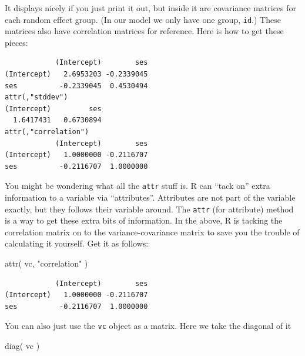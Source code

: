 \documentclass[
  letterpaper,
  DIV=11,
  numbers=noendperiod]{scrreprt}
\newenvironment{Shaded}{}{}
\newcommand{\FunctionTok}[1]{\textcolor[rgb]{0.02,0.16,0.49}{#1}}
\newcommand{\NormalTok}[1]{#1}
\newcommand{\OtherTok}[1]{\textcolor[rgb]{0.00,0.44,0.13}{#1}}
\newcommand{\SpecialCharTok}[1]{\textcolor[rgb]{0.25,0.44,0.63}{#1}}
\newcommand{\StringTok}[1]{\textcolor[rgb]{0.25,0.44,0.63}{#1}}
\begin{document}
It displays nicely if you just print it out, but inside it are
covariance matrices for each random effect group. (In our model we only
have one group, \texttt{id}.) These matrices also have correlation
matrices for reference. Here is how to get these pieces:

\begin{Shaded}
\end{Shaded}

\begin{verbatim}
            (Intercept)        ses
(Intercept)   2.6953203 -0.2339045
ses          -0.2339045  0.4530494
attr(,"stddev")
(Intercept)         ses 
  1.6417431   0.6730894 
attr(,"correlation")
            (Intercept)        ses
(Intercept)   1.0000000 -0.2116707
ses          -0.2116707  1.0000000
\end{verbatim}

You might be wondering what all the \texttt{attr} stuff is. R can ``tack
on'' extra information to a variable via ``attributes''. Attributes are
not part of the variable exactly, but they follows their variable
around. The \texttt{attr} (for attribute) method is a way to get these
extra bits of information. In the above, R is tacking the correlation
matrix on to the variance-covariance matrix to save you the trouble of
calculating it yourself. Get it as follows:

\begin{Shaded}
\begin{Highlighting}[]
\FunctionTok{attr}\NormalTok{( vc, }\StringTok{"correlation"}\NormalTok{ )}
\end{Highlighting}
\end{Shaded}

\begin{verbatim}
            (Intercept)        ses
(Intercept)   1.0000000 -0.2116707
ses          -0.2116707  1.0000000
\end{verbatim}

You can also just use the \texttt{vc} object as a matrix. Here we take
the diagonal of it

\begin{Shaded}
\begin{Highlighting}[]
\FunctionTok{diag}\NormalTok{( vc )}
\end{Highlighting}
\end{Shaded}
\end{document}
